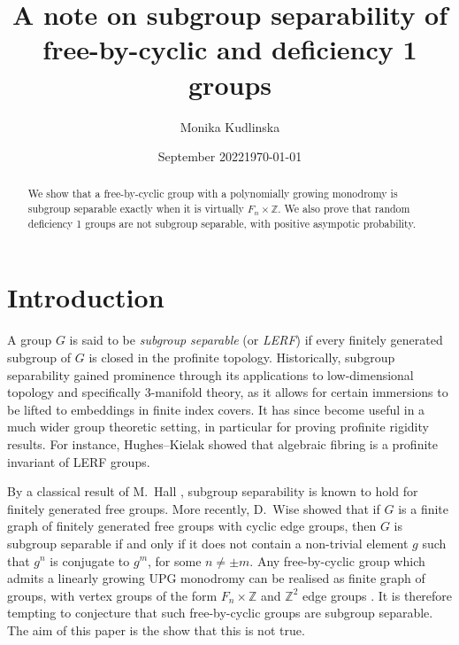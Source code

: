 



\title[LERF-ness of F-by-Z's and deficiency 1 groups]{A note on subgroup separability of free-by-cyclic and deficiency 1 groups}
\author{Monika Kudlinska}
\date{September 2022}

\address{Mathematical Institute, Andrew Wiles Building, Observatory Quarter, University of Oxford, Oxford OX2 6GG, UK}
\date{\today}




\maketitle

\begin{abstract}
We show that a free-by-cyclic group with a polynomially growing monodromy is subgroup separable exactly when it is virtually $F_n \times \mathbb{Z}$. We also prove that random deficiency 1 groups are not subgroup separable, with positive asympotic probability.
\end{abstract}

\section{Introduction}

A group $G$ is said to be \emph{subgroup separable} (or \emph{LERF}) if every finitely generated subgroup of $G$ is closed in the profinite topology. Historically, subgroup separability gained prominence through its applications to low-dimensional topology and specifically 3-manifold theory, as it allows for certain immersions to be lifted to embeddings in finite index covers. It has since become useful in a much wider group theoretic setting, in particular for proving profinite rigidity results. For instance, Hughes--Kielak \cite{HughesKielak2022} showed that algebraic fibring is a profinite invariant of LERF groups.

By a classical result of M.~Hall \cite{Hall}, subgroup separability is known to hold for finitely generated free groups. More recently, D.~Wise \cite{Wise} showed that if $G$ is a finite graph of finitely generated free groups with cyclic edge groups, then $G$ is subgroup separable if and only if it does not contain a non-trivial element $g$ such that $g^n$ is conjugate to $g^m$, for some $n \neq \pm m$. Any free-by-cyclic group which admits a linearly growing UPG monodromy can be realised as finite graph of groups, with vertex groups of the form $F_n \times \mathbb{Z}$ and $\mathbb{Z}^2$ edge groups \cite[Proposition 5.2.2]{NM}. It is therefore tempting to conjecture that such free-by-cyclic groups are subgroup separable. The aim of this paper is the show that this is not true. 

